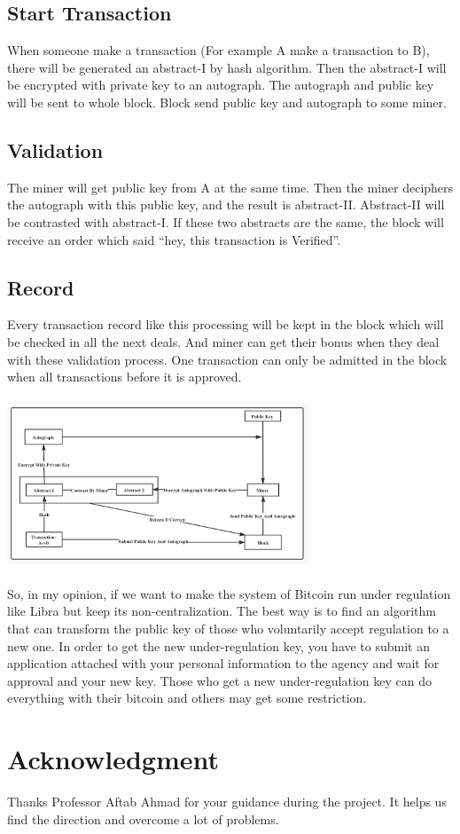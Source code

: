 \documentclass[conference]{IEEEtran}
\begin{document}
\subsection{Start Transaction}
When someone make a transaction (For example A make a transaction to B), there will be generated an abstract-I by hash algorithm. Then the abstract-I will be encrypted with private key to an autograph. The autograph and public key will be sent to whole block. Block send public key and autograph to some miner. 
\subsection{Validation}
The miner will get public key from A at the same time. Then the miner deciphers the autograph with this public key, and the result is abstract-II. Abstract-II will be contrasted with abstract-I. If these two abstracts are the same, the block will receive an order which said “hey, this transaction is Verified”.
\subsection{Record}
Every transaction record like this processing will be kept in the block which will be checked in all the next deals. And miner can get their bonus when they deal with these validation process. One transaction can only be admitted in the block when all transactions before it is approved. 
\\
\\
\includegraphics[width = 9cm]{likai1.png}
\\
\\

So, in my opinion, if we want to make the system of Bitcoin run under regulation like Libra but keep its non-centralization. The best way is to find an algorithm that can transform the public key of those who voluntarily accept regulation to a new one.  In order to get the new under-regulation key, you have to submit an application attached with your personal information to the agency and wait for approval and your new key. Those who get a new under-regulation key can do everything with their bitcoin and others may get some restriction.




\section*{Acknowledgment}

Thanks Professor Aftab Ahmad for your guidance during the project. It helps us find the direction and overcome a lot of problems.




\end{document}

